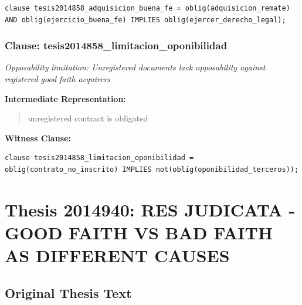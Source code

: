 \documentclass[11pt,a4paper]{article}
\begin{document}
\begin{lstlisting}[style=witnessstyle, language=Witness]
clause tesis2014858_adquisicion_buena_fe = oblig(adquisicion_remate) AND oblig(ejercicio_buena_fe) IMPLIES oblig(ejercer_derecho_legal);
\end{lstlisting}

\subsubsection{Clause: tesis2014858\_limitacion\_oponibilidad}

\textit{Opposability limitation: Unregistered documents lack opposability against registered good faith acquirers}

\textbf{Intermediate Representation:}

\begin{quote}
unregistered contract is obligated
\end{quote}

\textbf{Witness Clause:}

\begin{lstlisting}[style=witnessstyle, language=Witness]
clause tesis2014858_limitacion_oponibilidad = oblig(contrato_no_inscrito) IMPLIES not(oblig(oponibilidad_terceros));
\end{lstlisting}

\newpage

\section{Thesis 2014940: RES JUDICATA - GOOD FAITH VS BAD FAITH AS DIFFERENT CAUSES}
\label{thesis:2014940}

\subsection{Original Thesis Text}
\end{document}
